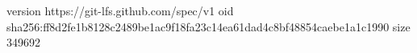 version https://git-lfs.github.com/spec/v1
oid sha256:ff8d2fe1b8128c2489be1ac9f18fa23c14ea61dad4c8bf48854caebe1a1c1990
size 349692
